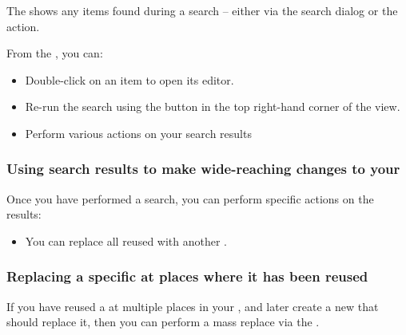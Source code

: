 The \gdsearchresultview{} shows any items found during a search -- either via the search dialog or the  action.

From the \gdsearchresultview{}, you can:

\begin{itemize}
\item Double-click on an item to open its editor. 
\item Re-run the search using the button in the top right-hand corner of the view. 
\item Perform various actions on your search results 
\end{itemize}

\subsubsection{Using search results to make wide-reaching changes to your \gdproject{}}
\label{TasksSearchResultActions}

Once you have performed a search, you can perform specific actions on the results:
\begin{itemize}
\item You can replace all reused \gdcases{} with another \gdcase{} .
\end{itemize}

\subsubsection{Replacing a specific \gdcase{} at places where it has been reused }
\label{TasksSearchResultReplaceTC}

If you have reused a \gdcase{} at multiple places in your \gdproject{}, and later create a new \gdcase{} that should replace it, then you can perform a mass replace via the \gdsearchresultview{}. 


